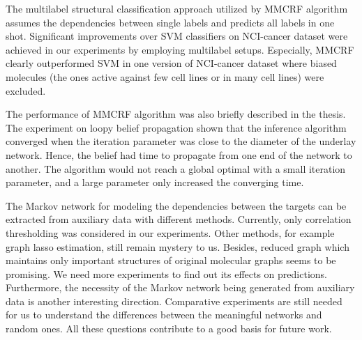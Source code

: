 \documentclass[english]{tktltiki}
\begin{document}
The multilabel structural classification approach utilized by MMCRF algorithm assumes the dependencies between single labels and predicts all labels in one shot. Significant improvements over SVM classifiers on NCI-cancer dataset were achieved in our experiments by employing multilabel setups. Especially, MMCRF clearly outperformed SVM in one version of NCI-cancer dataset where biased molecules (the ones active against few cell lines or in many cell lines) were excluded.

The performance of MMCRF algorithm was also briefly described in the thesis. The experiment on loopy belief propagation shown that the inference algorithm converged when the iteration parameter was close to the diameter of the underlay network. Hence, the belief had time to propagate from one end of the network to another. The algorithm would not reach a global optimal with a small iteration parameter, and a large parameter only increased the converging time.

The Markov network for modeling the dependencies between the targets can be extracted from auxiliary data with different methods. Currently, only correlation thresholding was considered in our experiments. Other methods, for example graph lasso estimation, still remain mystery to us. Besides, reduced graph which maintains only important structures of original molecular graphs seems to be promising. We need more experiments to find out its effects on predictions. Furthermore, the necessity of the Markov network being generated from auxiliary data is another interesting direction. Comparative experiments are still needed for us to understand the differences between the meaningful networks and random ones. All these questions contribute to a good basis for future work. 



%
%
\clearpage
\nocite{*}



\lastpage


%
%
\appendices
\end{document}
